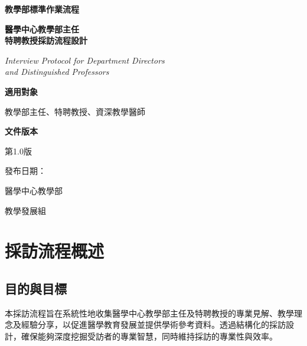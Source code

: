 \documentclass[12pt,a4paper]{article}
\newcommand{\mydate}{\DTMtoday}
\begin{document}
\begin{titlepage}
    \centering
    {\LARGE\textcolor{interview_red}{\textbf{教學部標準作業流程}}\par}
    \vspace{1cm}
    {\huge\bfseries 醫學中心教學部主任\\特聘教授採訪流程設計\par}
    \vspace{0.5cm}
    {\Large\textcolor{interview_blue}{\textit{Interview Protocol for Department Directors\\and Distinguished Professors}}\par}
    \vspace{1cm}
    
    \begin{tcolorbox}[
        colback=interview_blue!5!white,
        colframe=interview_blue,
        width=0.8\textwidth,
        arc=10pt,
        boxrule=1pt
    ]
    \centering
    {\large\textbf{適用對象}\par}
    \vspace{0.3cm}
    教學部主任、特聘教授、資深教學醫師\par
    \vspace{0.5cm}
    {\large\textbf{文件版本}\par}
    \vspace{0.3cm}
    第1.0版\par
    發布日期：\mydate\par
    \end{tcolorbox}

    \vfill
    
    {\large 醫學中心教學部\par}
    {\large 教學發展組\par}
    
    \vspace{0.5cm}
\end{titlepage}

\newpage
\tableofcontents
\newpage

\section{採訪流程概述}

\subsection{目的與目標}
本採訪流程旨在系統性地收集醫學中心教學部主任及特聘教授的專業見解、教學理念及經驗分享，以促進醫學教育發展並提供學術參考資料。透過結構化的採訪設計，確保能夠深度挖掘受訪者的專業智慧，同時維持採訪的專業性與效率。
\end{document}
